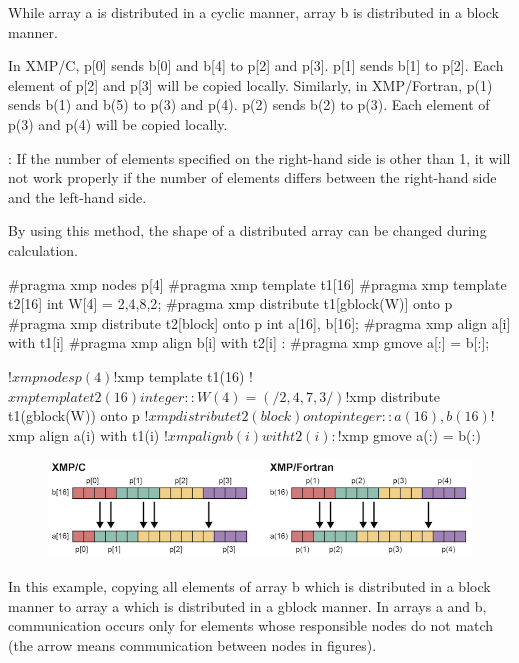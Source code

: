 While array a is distributed in a cyclic manner, array b is distributed
in a block manner.

In XMP/C, p[0] sends b[0] and b[4] to p[2] and p[3]. p[1] sends b[1] to
p[2]. Each element of p[2] and p[3] will be copied locally. Similarly,
in XMP/Fortran, p(1) sends b(1) and b(5) to p(3) and p(4). p(2) sends
b(2) to p(3). Each element of p(3) and p(4) will be copied locally.

\noindent\hrulefill

: If the number of elements specified on the
right-hand side is other than
1, it will not work properly if the number of elements differs between
the right-hand side and the left-hand side.

\noindent\hrulefill

By using this method, the shape of a distributed array can be changed
during calculation.

\begin{XCexample}
#pragma xmp nodes p[4]
#pragma xmp template t1[16]
#pragma xmp template t2[16]
int W[4] = {2,4,8,2};
#pragma xmp distribute t1[gblock(W)] onto p
#pragma xmp distribute t2[block] onto p
int a[16], b[16];
#pragma xmp align a[i] with t1[i]
#pragma xmp align b[i] with t2[i]
     :
#pragma xmp gmove
  a[:] = b[:];
\end{XCexample}

\begin{XFexample}
!$xmp nodes p(4)
!$xmp template t1(16)
!$xmp template t2(16)
integer :: W(4) = (/2,4,7,3/)
!$xmp distribute t1(gblock(W)) onto p
!$xmp distribute t2(block) onto p
integer :: a(16), b(16)
!$xmp align a(i) with t1(i)
!$xmp align b(i) with t2(i)
     :
!$xmp gmove
  a(:) = b(:)
\end{XFexample}

\begin{figure}
  \centering
  \includegraphics{figs/gmove_change.png}
\end{figure}

In this example, copying all elements of array b which is distributed in
a block manner to array a which is distributed in a gblock manner. In
arrays a and b, communication occurs only for elements whose responsible
nodes do not match (the arrow means communication between nodes in
figures).

